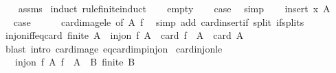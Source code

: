 \begin{isabellebody}
%
\isadelimproof
\ \ %
\endisadelimproof
%
\isatagproof
{}\isamarkupfalse%
\ assms\isanewline
{}\isamarkupfalse%
\ {\isacharparenleft}{\kern0pt}induct\ rule{\isacharcolon}{\kern0pt}finite{\isacharunderscore}{\kern0pt}induct{\isacharparenright}{\kern0pt}\isanewline
\ \ \isamarkupfalse%
\ empty\isanewline
\ \ \isamarkupfalse%
\ {\isacharquery}{\kern0pt}case\ \isamarkupfalse%
\ simp\isanewline
{}\isamarkupfalse%
\isanewline
\ \ \isamarkupfalse%
\ {\isacharparenleft}{\kern0pt}insert\ x\ A{\isacharparenright}{\kern0pt}\isanewline
\ \ \isamarkupfalse%
\ \isamarkupfalse%
\ {\isacharquery}{\kern0pt}case\isanewline
\ \ \ \ \isamarkupfalse%
\ card{\isacharunderscore}{\kern0pt}image{\isacharunderscore}{\kern0pt}le\ {\isacharbrackleft}{\kern0pt}of\ A\ f{\isacharbrackright}{\kern0pt}\ \isamarkupfalse%
\ {\isacharparenleft}{\kern0pt}simp\ add{\isacharcolon}{\kern0pt}\ card{\isacharunderscore}{\kern0pt}insert{\isacharunderscore}{\kern0pt}if\ split{\isacharcolon}{\kern0pt}\ if{\isacharunderscore}{\kern0pt}splits{\isacharparenright}{\kern0pt}\isanewline
{}\isamarkupfalse%
%
\endisatagproof
{\isafoldproof}%
%
\isadelimproof
\isanewline
%
\endisadelimproof
\isanewline
{}\isamarkupfalse%
\ inj{\isacharunderscore}{\kern0pt}on{\isacharunderscore}{\kern0pt}iff{\isacharunderscore}{\kern0pt}eq{\isacharunderscore}{\kern0pt}card{\isacharcolon}{\kern0pt}\ {\isachardoublequoteopen}finite\ A\ {\isasymLongrightarrow}\ inj{\isacharunderscore}{\kern0pt}on\ f\ A\ {\isasymlongleftrightarrow}\ card\ {\isacharparenleft}{\kern0pt}f\ {\isacharbackquote}{\kern0pt}\ A{\isacharparenright}{\kern0pt}\ {\isacharequal}{\kern0pt}\ card\ A{\isachardoublequoteclose}\isanewline
%
\isadelimproof
\ \ %
\endisadelimproof
%
\isatagproof
{}\isamarkupfalse%
\ {\isacharparenleft}{\kern0pt}blast\ intro{\isacharcolon}{\kern0pt}\ card{\isacharunderscore}{\kern0pt}image\ eq{\isacharunderscore}{\kern0pt}card{\isacharunderscore}{\kern0pt}imp{\isacharunderscore}{\kern0pt}inj{\isacharunderscore}{\kern0pt}on{\isacharparenright}{\kern0pt}%
\endisatagproof
{\isafoldproof}%
%
\isadelimproof
\isanewline
%
\endisadelimproof
\isanewline
{}\isamarkupfalse%
\ card{\isacharunderscore}{\kern0pt}inj{\isacharunderscore}{\kern0pt}on{\isacharunderscore}{\kern0pt}le{\isacharcolon}{\kern0pt}\isanewline
\ \ \ {\isachardoublequoteopen}inj{\isacharunderscore}{\kern0pt}on\ f\ A{\isachardoublequoteclose}\ {\isachardoublequoteopen}f\ {\isacharbackquote}{\kern0pt}\ A\ {\isasymsubseteq}\ B{\isachardoublequoteclose}\ {\isachardoublequoteopen}finite\ B{\isachardoublequoteclose}\isanewline

\end{isabellebody}

